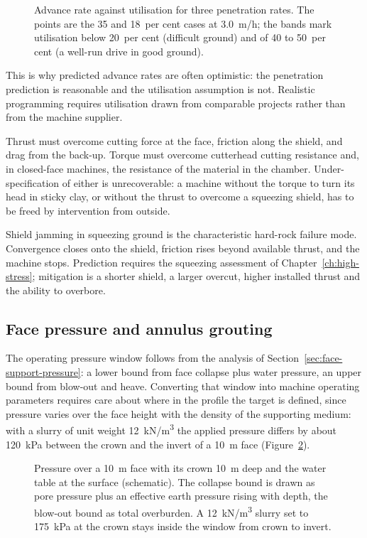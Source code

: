 \begin{figure}[htbp]
\centering
{}
\caption{Advance rate against utilisation for three penetration rates. The points are the 35 and 18~per cent cases at 3.0~m/h; the bands mark utilisation below 20~per cent (difficult ground) and of 40 to 50~per cent (a well-run drive in good ground).}
\label{fig:advance-rate}
\end{figure}

This is why predicted advance rates are often optimistic: the penetration
prediction is reasonable and the utilisation assumption is not. Realistic
programming requires utilisation drawn from comparable projects rather than
from the machine supplier.

Thrust must overcome cutting force at the face, friction along the shield, and
drag from the back-up. Torque must overcome cutterhead cutting resistance and,
in closed-face machines, the resistance of the material in the chamber.
Under-specification of either is unrecoverable: a machine without the torque to
turn its head in sticky clay, or without the thrust to overcome a squeezing
shield, has to be freed by intervention from outside.

Shield jamming in squeezing ground is the characteristic hard-rock failure
mode. Convergence closes onto the shield, friction rises beyond available
thrust, and the machine stops. Prediction requires the squeezing assessment of
Chapter~\ref{ch:high-stress}; mitigation is a shorter shield, a larger overcut,
higher installed thrust and the ability to overbore.

\subsection{Face pressure and annulus grouting}
\label{sec:face-pressure-grouting}

The operating pressure window follows from the analysis of
Section~\ref{sec:face-support-pressure}: a lower bound from face collapse plus water
pressure, an upper bound from blow-out and heave. Converting that window into
machine operating parameters requires care about where in the profile the
target is defined, since pressure varies over the face height with the density
of the supporting medium: with a slurry of unit weight
12~kN/m\textsuperscript{3} the applied pressure differs by about 120~kPa
between the crown and the invert of a 10~m face
(Figure~\ref{fig:face-pressure-profile}).

\begin{figure}[htbp]
\centering
{}
\caption{Pressure over a 10~m face with its crown 10~m deep and the water table at the surface (schematic). The collapse bound is drawn as pore pressure plus an effective earth pressure rising with depth, the blow-out bound as total overburden. A 12~kN/m\textsuperscript{3} slurry set to 175~kPa at the crown stays inside the window from crown to invert.}
\label{fig:face-pressure-profile}
\end{figure}

